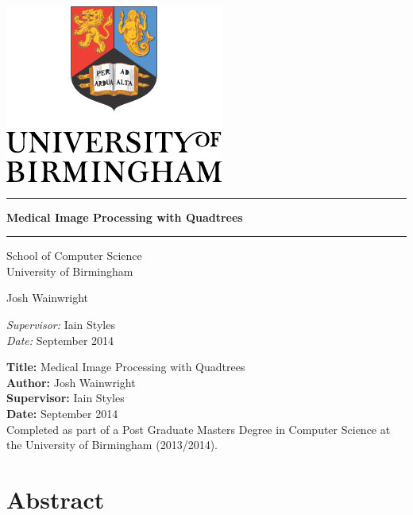 
\begin{titlepage}
	\begin{center}
		\vspace*{\fill}

		\centering
		\includegraphics[scale=1.0]{Logo.pdf}
		\vfill

		\hrule
		{\LARGE\bf Medical Image Processing with Quadtrees\\[0.4cm]}
		\hrule

		\vfill
		\large
		School of Computer Science\\
		University of Birmingham

		\vfill
		Josh Wainwright
		\vfill

		\vfill
		\textit{Supervisor:} Iain Styles \\
		\vfill
		\textit{Date:} September 2014
		\vfill
		\vfill

	\end{center}
\end{titlepage}
\restoregeometry%

\thispagestyle{empty}

\textbf{Title:} Medical Image Processing with Quadtrees \\
\textbf{Author:} Josh Wainwright \\
\textbf{Supervisor:} Iain Styles \\
\textbf{Date:} September 2014 \\
\textbf{}
\vfill
Completed as part of a Post Graduate Masters Degree in Computer Science at the
University of Birmingham (2013/2014).


\thispagestyle{empty}
\part*{Abstract}
\label{prt:abstract}

